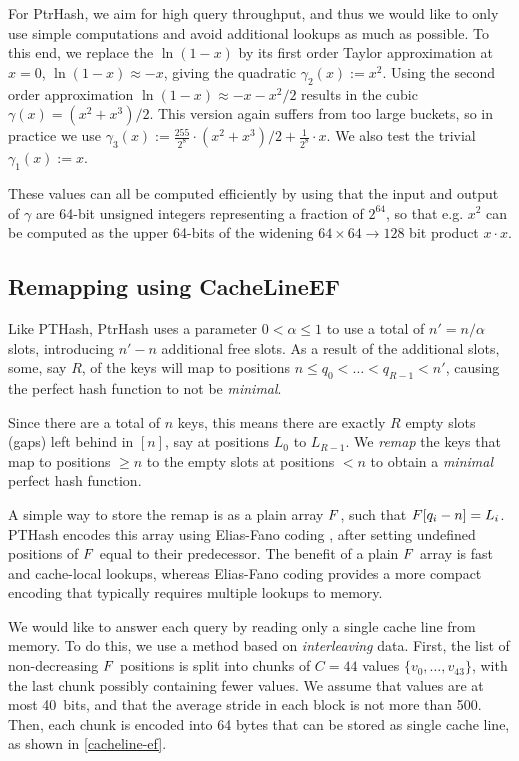 \documentclass[a4paper,UKenglish,cleveref,thm-restate]{lipics-v2021}
\begin{document}
For PtrHash, we aim for high query throughput, and thus we would like to only
use simple computations and avoid additional lookups as much as possible.
To this end, we replace the \(\ln (1-x)\) by its
first order Taylor approximation at \(x=0\), \(\ln(1-x) \approx -x\), giving
the quadratic \(\gamma_2(x) := x^2\). Using the second order approximation \(\ln(1-x) \approx
-x-x^2/2\) results in the cubic \(\gamma(x) = (x^2+x^3)/2\). This version again
suffers from too large buckets, so in practice we use \(\gamma_3(x) :=
\frac{255}{2^8}\cdot (x^2+x^3)/2 + \frac{1}{2^8}\cdot x\).
We also test the trivial \(\gamma_1(x):=x\).

These values can all be computed efficiently by using that the input and output
of \(\gamma\) are 64-bit unsigned integers representing a fraction of \(2^{64}\),
so that e.g. \(x^2\) can be computed as the upper 64-bits of the widening \(64\times64\to 128\) bit
product \(x\cdot x\).
\subsection{Remapping using CacheLineEF}
\label{remapping}
Like PTHash, PtrHash uses a parameter \(0<\alpha\leq 1\) to use a total of
\(n'=n/\alpha\) slots, introducing \(n'-n\) additional free slots.
As a result of the additional slots, some, say \(R\), of the keys will map to positions \(n\leq
q_0<\dots< q_{R-1}< n'\), causing the perfect hash function to not be \emph{minimal}.

 Since there are a total of \(n\) keys, this means there are exactly \(R\) empty
slots (gaps) left behind in \([n]\), say at positions \(L_0\) to \(L_{R-1}\).
We \emph{remap} the keys that map to positions \(\geq n\) to the empty slots at
positions \(< n\) to obtain a \emph{minimal} perfect hash function.

A simple way to store the remap is as a plain array \(F\), such that
\(F[q_i-n] = L_i\).
PTHash encodes this array using Elias-Fano coding \cite{elias,fano}, after setting undefined
positions of \(F\) equal to their predecessor.
The benefit of a plain \(F\) array is fast and cache-local lookups, whereas
Elias-Fano coding provides a more compact encoding that typically requires multiple
lookups to memory.


We would like to answer each query by reading only a single cache line from
memory. To do this, we use a method based on \emph{interleaving} data.
First, the list of non-decreasing \(F\) positions is split into chunks of
\(C=44\) values \(\{v_0, \dots, v_{43}\}\), with the last chunk possibly containing fewer values.
We assume that values are at most 40~bits, and that the average stride in each
block is not more than 500.
Then, each chunk is encoded into 64 bytes that can be stored as single cache
line, as shown in \cref{cacheline-ef}.
\end{document}
